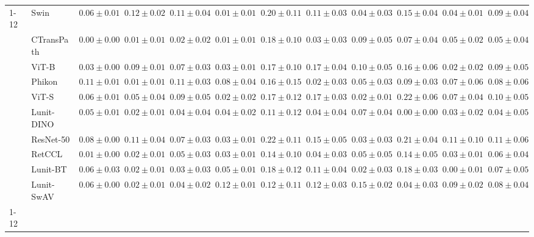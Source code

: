 \begin{tabular}{ll|cccc|c|cccc|c}
\cline{1-12}
\multirow[t]{10}{*}{Mean pool} & Swin & $0.06 \pm 0.01$ & $0.12 \pm 0.02$ & $0.11 \pm 0.04$ & $0.01 \pm 0.01$ & $0.20 \pm 0.11$ & $0.11 \pm 0.03$ & $0.04 \pm 0.03$ & $0.15 \pm 0.04$ & $0.04 \pm 0.01$ & $0.09 \pm 0.04$ \\
 & CTransPath & $\mathbf{0.00 \pm 0.00}$ & $\mathbf{0.01 \pm 0.01}$ & $\mathbf{0.02 \pm 0.02}$ & $\mathbf{0.01 \pm 0.01}$ & $0.18 \pm 0.10$ & $0.03 \pm 0.03$ & $0.09 \pm 0.05$ & $0.07 \pm 0.04$ & $0.05 \pm 0.02$ & $0.05 \pm 0.04$ \\
 & ViT-B & $0.03 \pm 0.00$ & $0.09 \pm 0.01$ & $0.07 \pm 0.03$ & $0.03 \pm 0.01$ & $0.17 \pm 0.10$ & $0.17 \pm 0.04$ & $0.10 \pm 0.05$ & $0.16 \pm 0.06$ & $0.02 \pm 0.02$ & $0.09 \pm 0.05$ \\
 & Phikon & $0.11 \pm 0.01$ & $0.01 \pm 0.01$ & $0.11 \pm 0.03$ & $0.08 \pm 0.04$ & $0.16 \pm 0.15$ & $\mathbf{0.02 \pm 0.03}$ & $0.05 \pm 0.03$ & $0.09 \pm 0.03$ & $0.07 \pm 0.06$ & $0.08 \pm 0.06$ \\
 & ViT-S & $0.06 \pm 0.01$ & $0.05 \pm 0.04$ & $0.09 \pm 0.05$ & $0.02 \pm 0.02$ & $0.17 \pm 0.12$ & $0.17 \pm 0.03$ & $\mathbf{0.02 \pm 0.01}$ & $0.22 \pm 0.06$ & $0.07 \pm 0.04$ & $0.10 \pm 0.05$ \\
 & Lunit-DINO & $0.05 \pm 0.01$ & $0.02 \pm 0.01$ & $0.04 \pm 0.04$ & $0.04 \pm 0.02$ & $\mathbf{0.11 \pm 0.12}$ & $0.04 \pm 0.04$ & $0.07 \pm 0.04$ & $\mathbf{0.00 \pm 0.00}$ & $0.03 \pm 0.02$ & $\mathbf{0.04 \pm 0.05}$ \\
 & ResNet-50 & $0.08 \pm 0.00$ & $0.11 \pm 0.04$ & $0.07 \pm 0.03$ & $0.03 \pm 0.01$ & $0.22 \pm 0.11$ & $0.15 \pm 0.05$ & $0.03 \pm 0.03$ & $0.21 \pm 0.04$ & $0.11 \pm 0.10$ & $0.11 \pm 0.06$ \\
 & RetCCL & $0.01 \pm 0.00$ & $0.02 \pm 0.01$ & $0.05 \pm 0.03$ & $0.03 \pm 0.01$ & $0.14 \pm 0.10$ & $0.04 \pm 0.03$ & $0.05 \pm 0.05$ & $0.14 \pm 0.05$ & $0.03 \pm 0.01$ & $0.06 \pm 0.04$ \\
 & Lunit-BT & $0.06 \pm 0.03$ & $0.02 \pm 0.01$ & $0.03 \pm 0.03$ & $0.05 \pm 0.01$ & $0.18 \pm 0.12$ & $0.11 \pm 0.04$ & $0.02 \pm 0.03$ & $0.18 \pm 0.03$ & $\mathbf{0.00 \pm 0.01}$ & $0.07 \pm 0.05$ \\
 & Lunit-SwAV & $0.06 \pm 0.00$ & $0.02 \pm 0.01$ & $0.04 \pm 0.02$ & $0.12 \pm 0.01$ & $0.12 \pm 0.11$ & $0.12 \pm 0.03$ & $0.15 \pm 0.02$ & $0.04 \pm 0.03$ & $0.09 \pm 0.02$ & $0.08 \pm 0.04$ \\
\cline{1-12}
\bottomrule
\end{tabular}
